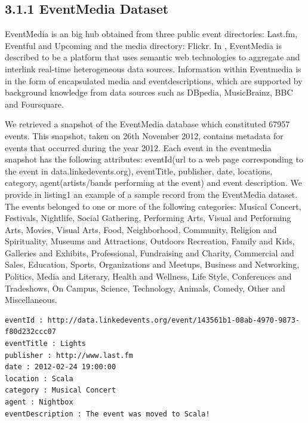 \documentclass[a4paper,11pt]{report}
\begin{document}
\subsection*{3.1.1 EventMedia Dataset}
EventMedia is an big hub obtained from three public event directories: Last.fm, Eventful and Upcoming and the media directory: Flickr. In \cite{EURECOM+3865}, EventMedia is described to be a platform that uses semantic web technologies to aggregate and interlink real-time heterogeneous data sources. Information within Eventmedia is in the form of encapsulated media and eventdescriptions, which are supported by background knowledge from data sources such as DBpedia, MusicBrainz, BBC and Foursquare. 

We retrieved a snapshot of the EventMedia database which constituted 67957 events. This snapshot, taken on 26th November 2012, contains metadata for events that occurred during the year 2012. Each event in the eventmedia snapshot has the following attributes: eventId(url to a web page corresponding to the event in data.linkedevents.org), eventTitle, publisher, date, locations, category, agent(artists/bands performing at the event) and event description. We provide in listing1 an example of a sample record from the EventMedia dataset. The events belonged to one or more of the following categories: Musical Concert, Festivals, Nightlife, Social Gathering, Performing Arts, Visual and Performing Arts, Movies, Visual Arts, Food, Neighborhood, Community, Religion and Spirituality, Museums and Attractions, Outdoors Recreation, Family and Kids, Galleries and Exhibits, Professional, Fundraising and Charity, Commercial and Sales, Education, Sports, Organizations and Meetups, Business and Networking, Politics, Media and Literary, Health and Wellness, Life Style, Conferences and Tradeshows, On Campus, Science, Technology, Animals, Comedy, Other and Miscellaneous. 

\begin{lstlisting}
eventId : http://data.linkedevents.org/event/143561b1-08ab-4970-9873-f80d232ccc07
eventTitle : Lights
publisher : http://www.last.fm
date : 2012-02-24 19:00:00
location : Scala
category : Musical Concert
agent : Nightbox
eventDescription : The event was moved to Scala!
\end{lstlisting}
\end{document}
